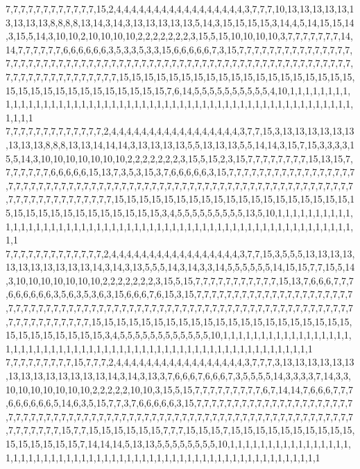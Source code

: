 7,7,7,7,7,7,7,7,7,7,7,7,15,2,4,4,4,4,4,4,4,4,4,4,4,4,4,4,4,4,4,3,7,7,7,10,13,13,13,13,13,13,13,13,13,8,8,8,8,13,14,3,14,3,13,13,13,13,13,5,14,3,15,15,15,15,3,14,4,5,14,15,15,14,3,15,5,14,3,10,10,2,10,10,10,10,2,2,2,2,2,2,2,3,15,5,15,10,10,10,10,3,7,7,7,7,7,7,7,14,14,7,7,7,7,7,7,6,6,6,6,6,6,3,5,3,3,5,3,3,15,6,6,6,6,6,7,3,15,7,7,7,7,7,7,7,7,7,7,7,7,7,7,7,7,7,7,7,7,7,7,7,7,7,7,7,7,7,7,7,7,7,7,7,7,7,7,7,7,7,7,7,7,7,7,7,7,7,7,7,7,7,7,7,7,7,7,7,7,7,7,7,7,7,7,7,7,7,7,7,7,7,7,7,7,15,15,15,15,15,15,15,15,15,15,15,15,15,15,15,15,15,15,15,15,15,15,15,15,15,15,15,15,15,15,15,15,7,6,14,5,5,5,5,5,5,5,5,5,5,4,10,1,1,1,1,1,1,1,1,1,1,1,1,1,1,1,1,1,1,1,1,1,1,1,1,1,1,1,1,1,1,1,1,1,1,1,1,1,1,1,1,1,1,1,1,1,1,1,1,1,1,1,1,1,1,1,1,1,1
7,7,7,7,7,7,7,7,7,7,7,7,7,2,4,4,4,4,4,4,4,4,4,4,4,4,4,4,4,4,4,3,7,7,15,3,13,13,13,13,13,13,13,13,13,8,8,8,13,13,14,14,14,3,13,13,13,13,5,5,13,13,13,5,5,14,14,3,15,7,15,3,3,3,3,15,5,14,3,10,10,10,10,10,10,10,2,2,2,2,2,2,2,3,15,5,15,2,3,15,7,7,7,7,7,7,7,7,15,13,15,7,7,7,7,7,7,7,6,6,6,6,6,15,13,7,3,5,3,15,3,7,6,6,6,6,6,3,15,7,7,7,7,7,7,7,7,7,7,7,7,7,7,7,7,7,7,7,7,7,7,7,7,7,7,7,7,7,7,7,7,7,7,7,7,7,7,7,7,7,7,7,7,7,7,7,7,7,7,7,7,7,7,7,7,7,7,7,7,7,7,7,7,7,7,7,7,7,7,7,7,7,7,7,7,7,15,15,15,15,15,15,15,15,15,15,15,15,15,15,15,15,15,15,15,15,15,15,15,15,15,15,15,15,15,15,15,15,3,4,5,5,5,5,5,5,5,5,5,13,5,10,1,1,1,1,1,1,1,1,1,1,1,1,1,1,1,1,1,1,1,1,1,1,1,1,1,1,1,1,1,1,1,1,1,1,1,1,1,1,1,1,1,1,1,1,1,1,1,1,1,1,1,1,1,1,1,1,1,1
7,7,7,7,7,7,7,7,7,7,7,7,7,2,4,4,4,4,4,4,4,4,4,4,4,4,4,4,4,4,4,3,7,7,15,3,5,5,5,13,13,13,13,13,13,13,13,13,13,13,14,3,14,3,13,5,5,5,14,3,14,3,3,14,5,5,5,5,5,5,14,15,15,7,7,15,5,14,3,10,10,10,10,10,10,10,2,2,2,2,2,2,2,3,15,5,15,7,7,7,7,7,7,7,7,7,7,7,15,13,7,6,6,6,7,7,7,6,6,6,6,6,6,3,5,6,3,5,3,6,3,15,6,6,6,7,6,15,3,15,7,7,7,7,7,7,7,7,7,7,7,7,7,7,7,7,7,7,7,7,7,7,7,7,7,7,7,7,7,7,7,7,7,7,7,7,7,7,7,7,7,7,7,7,7,7,7,7,7,7,7,7,7,7,7,7,7,7,7,7,7,7,7,7,7,7,7,7,7,7,7,7,7,7,7,7,7,7,15,15,15,15,15,15,15,15,15,15,15,15,15,15,15,15,15,15,15,15,15,15,15,15,15,15,15,15,15,3,4,5,5,5,5,5,5,5,5,5,5,5,5,10,1,1,1,1,1,1,1,1,1,1,1,1,1,1,1,1,1,1,1,1,1,1,1,1,1,1,1,1,1,1,1,1,1,1,1,1,1,1,1,1,1,1,1,1,1,1,1,1,1,1,1,1,1,1,1,1,1,1
7,7,7,7,7,7,7,7,7,15,7,7,7,2,4,4,4,4,4,4,4,4,4,4,4,4,4,4,4,4,4,3,7,7,7,3,13,13,13,13,13,13,13,13,13,13,13,13,13,13,14,3,14,3,13,3,7,6,6,6,7,6,6,6,7,3,5,5,5,5,14,3,3,3,3,7,14,3,3,10,10,10,10,10,10,10,2,2,2,2,2,10,10,3,15,5,15,7,7,7,7,7,7,7,7,7,6,7,14,14,7,6,6,6,7,7,7,6,6,6,6,6,6,5,14,6,3,5,15,7,7,3,7,6,6,6,6,6,3,15,7,7,7,7,7,7,7,7,7,7,7,7,7,7,7,7,7,7,7,7,7,7,7,7,7,7,7,7,7,7,7,7,7,7,7,7,7,7,7,7,7,7,7,7,7,7,7,7,7,7,7,7,7,7,7,7,7,7,7,7,7,7,7,7,7,7,7,7,7,7,7,7,7,7,15,7,7,15,15,15,15,15,15,7,7,7,15,15,15,7,15,15,15,15,15,15,15,15,15,15,15,15,15,15,15,15,7,14,14,14,5,13,13,5,5,5,5,5,5,5,5,10,1,1,1,1,1,1,1,1,1,1,1,1,1,1,1,1,1,1,1,1,1,1,1,1,1,1,1,1,1,1,1,1,1,1,1,1,1,1,1,1,1,1,1,1,1,1,1,1,1,1,1,1,1,1,1,1,1,1
